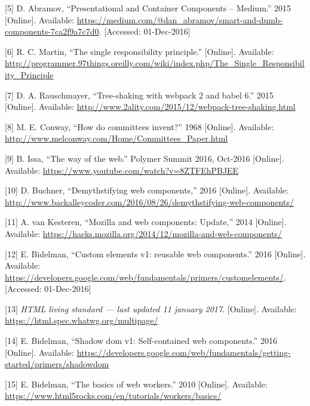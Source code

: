 \documentclass[]{assets/latex/ieee}
\begin{document}
\hypertarget{ref-Abramov2015}{}
{[}5{]} D. Abramov, ``Presentational and Container Components --
Medium.'' 2015 {[}Online{]}. Available:
\url{https://medium.com/@dan_abramov/smart-and-dumb-components-7ca2f9a7c7d0}.
{[}Accessed: 01-Dec-2016{]}

\hypertarget{ref-Martin}{}
{[}6{]} R. C. Martin, ``The single responsibility principle.''
{[}Online{]}. Available:
\url{http://programmer.97things.oreilly.com/wiki/index.php/The_Single_Responsibility_Principle}

\hypertarget{ref-Rauschmayer2015}{}
{[}7{]} D. A. Rauschmayer, ``Tree-shaking with webpack 2 and babel 6.''
2015 {[}Online{]}. Available:
\url{http://www.2ality.com/2015/12/webpack-tree-shaking.html}

\hypertarget{ref-Conway1968}{}
{[}8{]} M. E. Conway, ``How do committees invent?'' 1968 {[}Online{]}.
Available: \url{http://www.melconway.com/Home/Committees_Paper.html}

\hypertarget{ref-Issa2016}{}
{[}9{]} B. Issa, ``The way of the web.'' Polymer Summit 2016, Oct-2016
{[}Online{]}. Available:
\url{https://www.youtube.com/watch?v=8ZTFEhPBJEE}

\hypertarget{ref-Buchner2016}{}
{[}10{]} D. Buchner, ``Demythstifying web components,'' 2016
{[}Online{]}. Available:
\url{http://www.backalleycoder.com/2016/08/26/demythstifying-web-components/}

\hypertarget{ref-vanKesteren2014}{}
{[}11{]} A. van Kesteren, ``Mozilla and web components: Update,'' 2014
{[}Online{]}. Available:
\url{https://hacks.mozilla.org/2014/12/mozilla-and-web-components/}

\hypertarget{ref-Bidelman2016}{}
{[}12{]} E. Bidelman, ``Custom elements v1: reusable web components.''
2016 {[}Online{]}. Available:
\url{https://developers.google.com/web/fundamentals/primers/customelements/}.
{[}Accessed: 01-Dec-2016{]}

\hypertarget{ref-HTML}{}
{[}13{]} \emph{HTML living standard --- last updated 11 january 2017}.
{[}Online{]}. Available: \url{https://html.spec.whatwg.org/multipage/}

\hypertarget{ref-Bidelman2016shadow}{}
{[}14{]} E. Bidelman, ``Shadow dom v1: Self-contained web components.''
2016 {[}Online{]}. Available:
\url{https://developers.google.com/web/fundamentals/getting-started/primers/shadowdom}

\hypertarget{ref-Bidelman2010}{}
{[}15{]} E. Bidelman, ``The basics of web workers.'' 2010 {[}Online{]}.
Available: \url{https://www.html5rocks.com/en/tutorials/workers/basics/}
\end{document}
